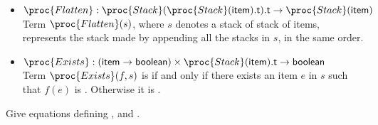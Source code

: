 \begin{itemize}
\begin{itemize}
      \item \(\proc{Flatten} :
        \proc{Stack}(\proc{Stack}(\type{item}).\type{t}).\type{t}
        \rightarrow \proc{Stack}(\type{item})\)\\ Term
        \(\proc{Flatten} (s)\), where \(s\) denotes a stack of
        stack of items, represents the stack made by appending all the
        stacks in \(s\), in the same order.

     \item \(\proc{Exists} : (\type{item} \rightarrow \type{boolean})
       \times \proc{Stack}(\type{item}).\type{t} \rightarrow
       \type{boolean}\)\\ Term \(\proc{Exists} (f, s)\) is
        if and only if there exists an item \(e\) in \(s\)
       such that \(f(e)\) is . Otherwise it is
       .

    \end{itemize}

  \end{itemize}

  Give equations defining ,  and .
